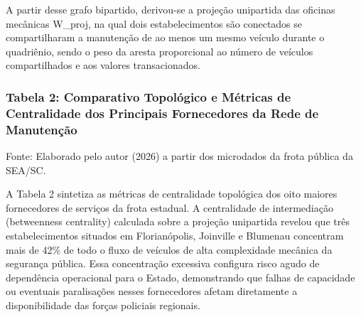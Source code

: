 \documentclass[12pt,a4paper]{article}
\begin{document}
A partir desse grafo bipartido, derivou-se a projeção unipartida das oficinas mecânicas W\_proj, na qual dois estabelecimentos são conectados se compartilharam a manutenção de ao menos um mesmo veículo durante o quadriênio, sendo o peso da aresta proporcional ao número de veículos compartilhados e aos valores transacionados.


\subsubsection{Tabela 2: Comparativo Topológico e Métricas de Centralidade dos Principais Fornecedores da Rede de Manutenção}

\begin{table}[htbp]
\centering
\small
{}
\end{table}

Fonte: Elaborado pelo autor (2026) a partir dos microdados da frota pública da SEA/SC.

A Tabela 2 sintetiza as métricas de centralidade topológica dos oito maiores fornecedores de serviços da frota estadual. A centralidade de intermediação (betweenness centrality) calculada sobre a projeção unipartida revelou que três estabelecimentos situados em Florianópolis, Joinville e Blumenau concentram mais de 42\% de todo o fluxo de veículos de alta complexidade mecânica da segurança pública. Essa concentração excessiva configura risco agudo de dependência operacional para o Estado, demonstrando que falhas de capacidade ou eventuais paralisações nesses fornecedores afetam diretamente a disponibilidade das forças policiais regionais.
\end{document}
